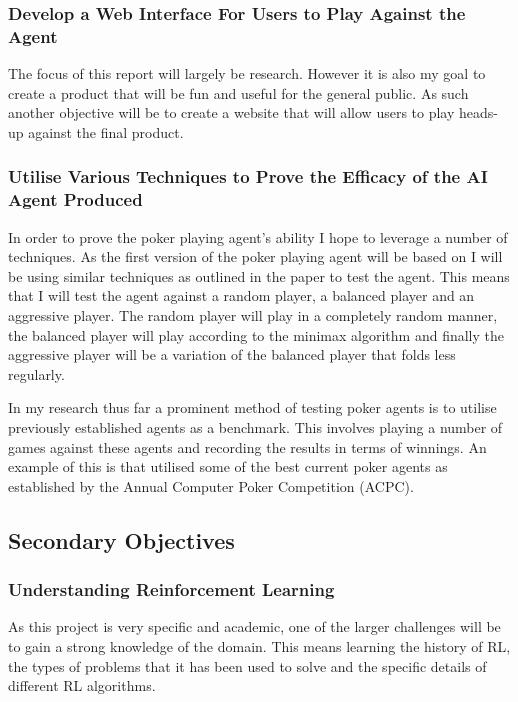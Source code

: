\subsubsection{Develop a Web Interface For Users to Play Against the Agent}
The focus of this report will largely be research.
However it is also my goal to create a product that will be fun and useful for the general public.
As such another objective will be to create a website that will allow users to play heads-up against the final product.


\subsubsection{Utilise Various Techniques to Prove the Efficacy of the AI Agent Produced}
In order to prove the poker playing agent's ability I hope to leverage a number of techniques.
As the first version of the poker playing agent will be based on\citep{dahl2001reinforcement} I will be using similar
techniques as outlined in the paper to test the agent.
This means that I will test the agent against a random player, a balanced player and an aggressive player.
The random player will play in a completely random manner, the balanced player will play according to the minimax
algorithm and finally the aggressive player will be a variation of the balanced player that folds less regularly.

In my research thus far a prominent method of testing poker agents is to utilise previously established agents as
a benchmark.
This involves playing a number of games against these agents and recording the results in terms of winnings.
An example of this is\citep{heinrich2016deep} that utilised some of the best current poker agents
as established by the Annual Computer Poker Competition (ACPC).

\subsection{Secondary Objectives}\label{subsec:secondaryObjectives}
\subsubsection{Understanding Reinforcement Learning}
As this project is very specific and academic, one of the larger challenges will be to gain a strong knowledge of the domain.
This means learning the history of RL, the types of problems that it has been used to solve and the specific details of
different RL algorithms.

